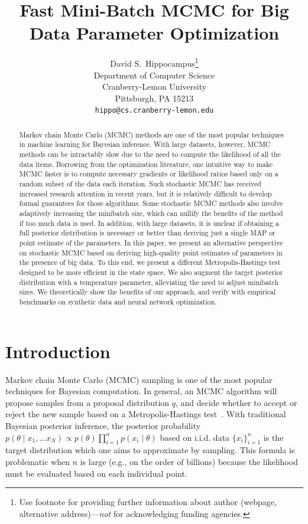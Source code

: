 \documentclass{article}
\title{Fast Mini-Batch MCMC for Big Data Parameter Optimization}
\author{
  David S.~Hippocampus\thanks{Use footnote for providing further
    information about author (webpage, alternative
    address)---\emph{not} for acknowledging funding agencies.} \\
  Department of Computer Science\\
  Cranberry-Lemon University\\
  Pittsburgh, PA 15213 \\
  \texttt{hippo@cs.cranberry-lemon.edu} \\
}
\begin{document}

\maketitle

\begin{abstract}
Markov chain Monte Carlo (MCMC) methods are one of the most popular techniques in machine learning
for Bayesian inference. With large datasets, however, MCMC methods can be intractably slow due to
the need to compute the likelihood of all the data items. Borrowing from the optimization
literature, one intuitive way to make MCMC faster is to compute necessary gradients or likelihood
ratios based only on a random subset of the data each iteration. Such stochastic MCMC has received
increased research attention in recent years, but it is relatively difficult to develop formal
guarantees for those algorithms. Some stochastic MCMC methods also involve adaptively increasing the
minibatch size, which can nullify the benefits of the method if too much data is used. In addition,
with large datasets, it is unclear if obtaining a full posterior distribution is necessary or better
than deriving just a single MAP or point estimate of the parameters. In this paper, we present an
alternative perspective on stochastic MCMC based on deriving high-quality point estimates of
parameters in the presence of big data. To this end, we present a different Metropolis-Hastings test
designed to be more efficient in the state space. We also augment the target posterior distribution
with a temperature parameter, alleviating the need to adjust minibatch sizes.  We theoretically
show the benefits of our approach, and verify with empirical benchmarks on synthetic data and neural
network optimization.
\end{abstract}



\section{Introduction}\label{sec:introduction}

Markov chain Monte Carlo (MCMC) sampling is one of the most popular techniques for Bayesian
computation. In general, an MCMC algorithm will propose samples from a proposal distribution $q$,
and decide whether to accept or reject the new sample based on a Metropolis-Hastings
test~\cite{Metropolis1953,hastings70}. With traditional Bayesian posterior inference, the posterior
probability $p(\theta \mid x_1, \ldots x_N) \propto p(\theta)\prod_{i=1}^np(x_i \mid \theta)$ based
on i.i.d. data $\{x_i\}_{i=1}^n$ is the target distribution which one aims to approximate by
sampling. This formula is problematic when $n$ is large (e.g., on the order of billions) because the
likelihood must be evaluated based on each individual point.
\end{document}
